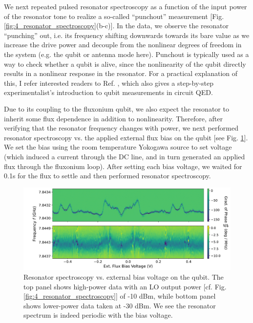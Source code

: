 We next repeated pulsed resonator spectroscopy as a function of the input power of the resonator tone to realize a so-called ``punchout'' measurement [Fig. \ref{fig:4_resonator_spectroscopy}(b-c)]. In the data, we observe the resonator ``punching'' out, i.e. its frequency shifting downwards towards its bare value as we increase the drive power and decouple from the nonlinear degrees of freedom in the system (e.g. the qubit or antenna mode here). Punchout is typically used as a way to check whether a qubit is alive, since the nonlinearity of the qubit directly results in a nonlinear response in the resonator. For a practical explanation of this, I refer interested readers to Ref. \cite{naghiloo2019introduction}, which also gives a step-by-step experimentalist's introduction to qubit measurements in circuit QED. 

Due to its coupling to the fluxonium qubit, we also expect the resonator to inherit some flux dependence in addition to nonlinearity. Therefore, after verifying that the resonator frequency changes with power, we next performed resonator spectroscopy vs. the applied external flux bias on the qubit [see Fig. \ref{fig:4_resonator_spectroscopy_vs_flux}]. We set the bias using the room temperature Yokogawa source to set voltage (which induced a current through the DC line, and in turn generated an applied flux through the fluxonium loop). After setting each bias voltage, we waited for 0.1s for the flux to settle and then performed resonator spectroscopy.  

\begin{figure}[h]
    \centering
    \includegraphics[width=\linewidth]{Figures/4/resonator_spectroscopy_vs_flux.pdf}
    \caption{Resonator spectroscopy vs. external bias voltage on the qubit. The top panel shows high-power data with an LO output power [cf. Fig. \ref{fig:4_resonator_spectroscopy}] of -10 dBm, while bottom panel shows lower-power data taken at -30 dBm. We see the resonator spectrum is indeed periodic with the bias voltage.}
\label{fig:4_resonator_spectroscopy_vs_flux}
\end{figure}

